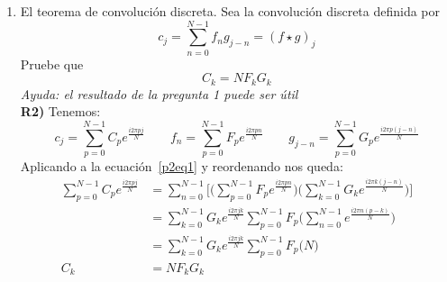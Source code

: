 \documentclass{article}
\begin{document}
\begin{enumerate}
    
    \item El teorema de convolución discreta. Sea la convolución discreta definida por
    \begin{equation}\label{p2eq1}
        c_j = \sum_{n=0}^{N-1} f_ng_{j-n} = (f \star g)_j
    \end{equation}
    Pruebe que 
    \begin{equation}\label{p2eq2}
        C_k = NF_kG_k
    \end{equation}
    \emph{Ayuda: el resultado de la pregunta 1 puede ser útil}\\
    \textbf{R2)} Tenemos:
    $$
        c_j = \sum_{p=0}^{N-1} C_p e^{\frac{i2\pi pj}{N}} \qquad
        f_n = \sum_{p=0}^{N-1} F_p e^{\frac{i2\pi pn}{N}} \qquad
        g_{j-n} = \sum_{p=0}^{N-1} G_p e^{\frac{i2\pi p(j-n)}{N}}
    $$
    Aplicando a la ecuación~\ref{p2eq1} y reordenando nos queda:
    \begin{align*}
        \sum_{p=0}^{N-1} C_p e^{\frac{i2\pi pj}{N}} &= 
        \sum_{n=0}^{N-1}\Big[
            \big(\sum_{p=0}^{N-1} F_p e^{\frac{i2\pi pn}{N}}\big)
            \big(\sum_{k=0}^{N-1} G_k e^{\frac{i2\pi k(j-n)}{N}}\big)\Big]\\
        &=  \sum_{k=0}^{N-1} G_k e^{\frac{i2\pi jk}{N}}
            \sum_{p=0}^{N-1} F_p 
            \big(\sum_{n=0}^{N-1} e^{\frac{i2\pi n(p-k)}{N}}\big)\\
        &=  \sum_{k=0}^{N-1} G_k e^{\frac{i2\pi jk}{N}}
            \sum_{p=0}^{N-1} F_p 
            \big(N)\\
        C_k &=  N F_k G_k
    \end{align*}
    

\end{enumerate}
\end{document}
